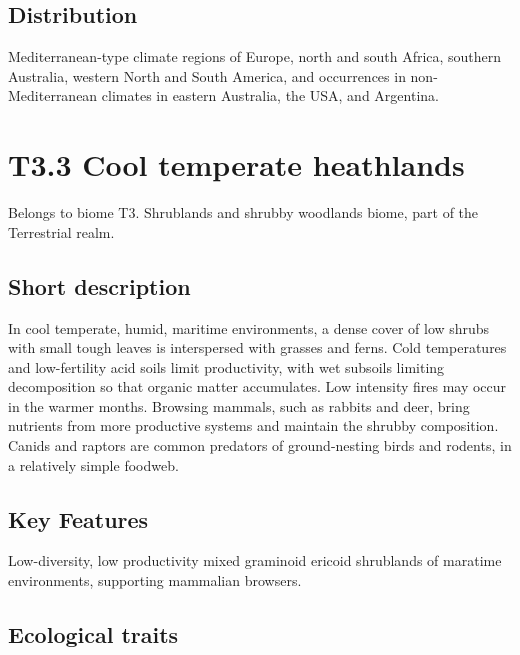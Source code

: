 \documentclass[
  letterpaper,
  DIV=11,
  numbers=noendperiod]{scrartcl}
\begin{document}
\subsection{Distribution}\label{distribution-80}

Mediterranean-type climate regions of Europe, north and south Africa,
southern Australia, western North and South America, and occurrences in
non-Mediterranean climates in eastern Australia, the USA, and Argentina.

\section{T3.3 Cool temperate
heathlands}\label{t3.3-cool-temperate-heathlands}

Belongs to biome T3. Shrublands and shrubby woodlands biome, part of the
Terrestrial realm.

\subsection{Short description}\label{short-description-81}

In cool temperate, humid, maritime environments, a dense cover of low
shrubs with small tough leaves is interspersed with grasses and ferns.
Cold temperatures and low-fertility acid soils limit productivity, with
wet subsoils limiting decomposition so that organic matter accumulates.
Low intensity fires may occur in the warmer months. Browsing mammals,
such as rabbits and deer, bring nutrients from more productive systems
and maintain the shrubby composition. Canids and raptors are common
predators of ground-nesting birds and rodents, in a relatively simple
foodweb.

\subsection{Key Features}\label{key-features-81}

Low-diversity, low productivity mixed graminoid ericoid shrublands of
maratime environments, supporting mammalian browsers.

\subsection{Ecological traits}\label{ecological-traits-81}
\end{document}

